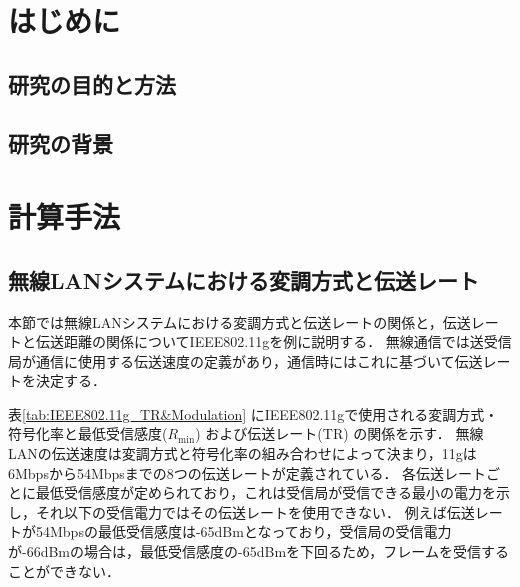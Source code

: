 \documentclass[a4paper,10.5pt]{ltjsarticle}
\begin{document}

\tableofcontents
\thispagestyle{empty}



\clearpage
\setcounter{page}{1}
\section{はじめに}

\subsection{研究の目的と方法}


\subsection{研究の背景}


\clearpage
\section{計算手法}

\subsection{無線LANシステムにおける変調方式と伝送レート}
本節では無線LANシステムにおける変調方式と伝送レートの関係と，伝送レートと伝送距離の関係についてIEEE802.11gを例に説明する．
無線通信では送受信局が通信に使用する伝送速度の定義があり，通信時にはこれに基づいて伝送レートを決定する．\par
表\ref{tab:IEEE802.11g_TR&Modulation} にIEEE802.11gで使用される変調方式・符号化率と最低受信感度($R_{\text{min}}$) および伝送レート(TR) の関係を示す．
無線LANの伝送速度は変調方式と符号化率の組み合わせによって決まり，11gは6Mbpsから54Mbpsまでの8つの伝送レートが定義されている．
各伝送レートごとに最低受信感度が定められており，これは受信局が受信できる最小の電力を示し，それ以下の受信電力ではその伝送レートを使用できない．
例えば伝送レートが54Mbpsの最低受信感度は-65dBmとなっており，受信局の受信電力が-66dBmの場合は，最低受信感度の-65dBmを下回るため，フレームを受信することができない．\par
\end{document}

